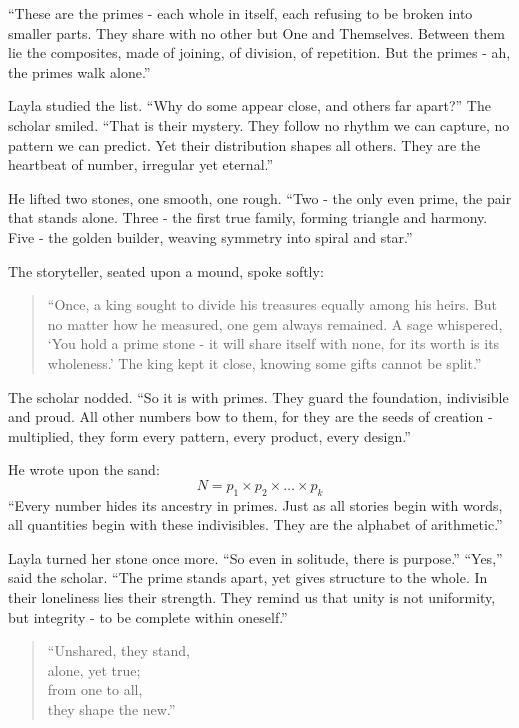 \documentclass[
  letterpaper,
  DIV=11,
  numbers=noendperiod]{scrreprt}
\begin{document}
``These are the primes - each whole in itself, each refusing to be
broken into smaller parts. They share with no other but One and
Themselves. Between them lie the composites, made of joining, of
division, of repetition. But the primes - ah, the primes walk alone.''

Layla studied the list. ``Why do some appear close, and others far
apart?'' The scholar smiled. ``That is their mystery. They follow no
rhythm we can capture, no pattern we can predict. Yet their distribution
shapes all others. They are the heartbeat of number, irregular yet
eternal.''

He lifted two stones, one smooth, one rough. ``Two - the only even
prime, the pair that stands alone. Three - the first true family,
forming triangle and harmony. Five - the golden builder, weaving
symmetry into spiral and star.''

The storyteller, seated upon a mound, spoke softly:

\begin{quote}
``Once, a king sought to divide his treasures equally among his heirs.
But no matter how he measured, one gem always remained. A sage
whispered, `You hold a prime stone - it will share itself with none, for
its worth is its wholeness.' The king kept it close, knowing some gifts
cannot be split.''
\end{quote}

The scholar nodded. ``So it is with primes. They guard the foundation,
indivisible and proud. All other numbers bow to them, for they are the
seeds of creation - multiplied, they form every pattern, every product,
every design.''

He wrote upon the sand: \[
N = p_1 \times p_2 \times \dots \times p_k
\] ``Every number hides its ancestry in primes. Just as all stories
begin with words, all quantities begin with these indivisibles. They are
the alphabet of arithmetic.''

Layla turned her stone once more. ``So even in solitude, there is
purpose.'' ``Yes,'' said the scholar. ``The prime stands apart, yet
gives structure to the whole. In their loneliness lies their strength.
They remind us that unity is not uniformity, but integrity - to be
complete within oneself.''

\begin{quote}
``Unshared, they stand,\\
alone, yet true;\\
from one to all,\\
they shape the new.''
\end{quote}
\end{document}
